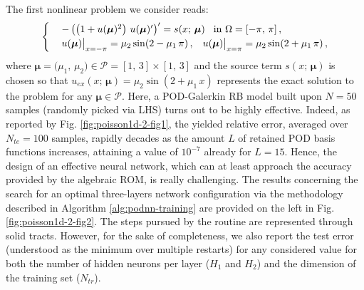\documentclass[12pt, a4paper, twoside, openright, notitlepage]{report}
\numberwithin{equation}{chapter}
\theoremstyle{theorem}
\theoremstyle{definition}
\theoremstyle{remark}
\theoremstyle{proposition}
\numberwithin{figure}{chapter}
\newcommand{\bg}[1]{\boldsymbol{#1}}
\begin{document}
		The first nonlinear problem we consider reads:
		\begin{equation}
			\label{eq:poisson1d-2}
			\begin{cases}
				& - \left( \big( 1 + u(\bg{\mu})^2 \big) ~ u(\bg{\mu})' \right)' = s(x; \, \bg{\mu}) \hspace*{0.3cm} \text{in $\Omega = [-\pi, \, \pi]$} \, , \\
				& u(\bg{\mu}) \big|_{x = -\pi} = \mu_2 \sin(2 - \mu_1 \, \pi) \, , \hspace*{0.3cm} u(\bg{\mu}) \big|_{x = \pi} = \mu_2 \sin(2 + \mu_1 \, \pi)  \, ,
			\end{cases}
		\end{equation}
		where $\bg{\mu} = \big( \mu_1, \, \mu_2 \big) \in \mathcal{P} = [1, \, 3] \times [1, \, 3]$ and the source term $s(x; \, \bg{\mu})$ is chosen so that $u_{ex}(x; \, \bg{\mu}) = \mu_2 \sin(2 + \mu_1 \, x)$ represents the exact solution to the problem for any $\bg{\mu} \in \mathcal{P}$. Here, a POD-Galerkin RB model built upon $N = 50$ samples (randomly picked via LHS) turns out to be highly effective. Indeed, as reported by Fig. \ref{fig:poisson1d-2-fig1}, the yielded relative error, averaged over $N_{te} = 100$ samples, rapidly decades as the amount $L$ of retained POD basis functions increases, attaining a value of $10^{-7}$ already for $L = 15$. Hence, the design of an effective neural network, which can at least approach the accuracy provided by the algebraic ROM, is really challenging. The results concerning the search for an optimal three-layers network configuration via the methodology described in Algorithm \ref{alg:podnn-training} are provided on the left in Fig. \ref{fig:poisson1d-2-fig2}. The steps pursued by the routine are represented through solid tracts. However, for the sake of completeness, we also report the test error (understood as the minimum over multiple restarts) for any considered value for both the number of hidden neurons per layer ($H_1$ and $H_2$) and the dimension of the training set ($N_{tr}$). 
		
\end{document}
